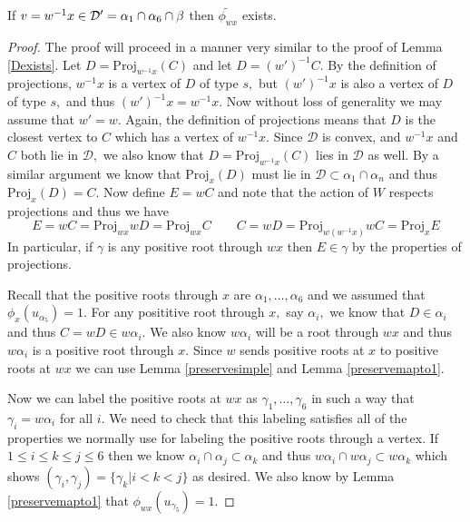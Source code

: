 \documentclass[class=book, crop=false]{standalone}
\begin{document}
\begin{lemma} 
	If $v=w^{-1}x\in \mathcal{D}'=\alpha_1\cap \alpha_6\cap \beta$ then $\tilde{\phi_{wx}}$ exists.
	\label{336f2Dexists}
\end{lemma}
\begin{proof}
	The proof will proceed in a manner very similar to the proof of Lemma \ref{Dexists}. Let $D=\mathrm{Proj}_{w^{-1}x}(C)$ and let $D=(w')^{-1}C.$ By the definition of projections, $w^{-1}x$ is a vertex of $D$ of type $s,$ but $(w')^{-1}x$ is also a vertex of $D$ of type $s,$ and thus $(w')^{-1}x=w^{-1}x.$ Now without loss of generality we may assume that $w'=w.$ Again, the definition of projections means that $D$ is the closest vertex to $C$ which has a vertex of $w^{-1}x.$ Since $\mathcal{D}$ is convex, and $w^{-1}x$ and $C$ both lie in $\mathcal{D},$ we also know that $D=\mathrm{Proj}_{w^{-1}x}(C)$ lies in $\mathcal{D}$ as well. By a similar argument we know that $\mathrm{Proj}_{x}(D)$ must lie in $\mathcal{D}\subset \alpha_1\cap \alpha_n$ and thus $\mathrm{Proj}_{x}(D)=C.$ Now define $E=wC$ and note that the action of $W$ respects projections and thus we have
	\[
		E=wC=\mathrm{Proj}_{wx}{wD}=\mathrm{Proj}_{wx}{C} \qquad C=wD=\mathrm{Proj}_{w(w^{-1}x)}{wC}=\mathrm{Proj}_{x}{E}
	\]
In particular, if $\gamma$ is any positive root through $wx$ then $E\in \gamma$ by the properties of projections.

Recall that the positive roots through $x$ are $\alpha_1,\dots,\alpha_6$ and we assumed that $\phi_x(u_{\alpha_5})=1.$ For any posititive root through $x,$ say $\alpha_i,$ we know that $D\in \alpha_i$ and thus $C=wD\in w\alpha_i.$ We also know $w\alpha_i$ will be a root through $wx$ and thus $w\alpha_i$ is a positive root through $x.$ Since $w$ sends positive roots at $x$ to positive roots at $wx$ we can use Lemma \ref{preservesimple} and Lemma \ref{preservemapto1}.

Now we can label the positive roots at $wx$ as $\gamma_1,\dots,\gamma_6$ in such a way that $\gamma_i=w\alpha_i$ for all $i.$ We need to check that this labeling satisfies all of the properties we normally use for labeling the positive roots through a vertex. If $1\le i\le k\le j\le 6$ then we know $\alpha_i\cap \alpha_j\subset \alpha_k$ and thus $w\alpha_i\cap w\alpha_j\subset w\alpha_k$ which shows $(\gamma_i,\gamma_j)=\{\gamma_k|i<k<j\}$ as desired. We also know by Lemma \ref{preservemapto1} that $\phi_{wx}(u_{\gamma_5})=1.$ 


\end{proof}
\end{document}
